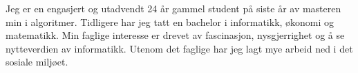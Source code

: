 %
%
%
\par{


Jeg er en engasjert og utadvendt 24 år gammel student på siste år av masteren min i algoritmer. Tidligere har jeg tatt en bachelor i informatikk, økonomi og matematikk. 
Min faglige interesse er drevet av fascinasjon, nysgjerrighet og å se nytteverdien av informatikk. Utenom det faglige har jeg lagt mye arbeid ned i det sosiale miljøet. 



}
